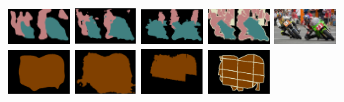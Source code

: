 \begin{figure}[h!]
\begin{subfigure}{0.55\textwidth}
		\includegraphics[width=0.18\textwidth]{image/result/compare/my_motor.png}
		\includegraphics[width=0.18\textwidth]{image/result/compare/fcn_motor.png}
		\includegraphics[width=0.18\textwidth]{image/result/compare/sds_motor.png}
		\includegraphics[width=0.18\textwidth]{image/result/compare/2007_005173.png}
		\includegraphics[width=0.18\textwidth]{image/result/compare/2007_005173.jpg}
		\\
		\includegraphics[width=0.18\textwidth]{image/result/compare/my_sheep.pdf}
		\includegraphics[width=0.18\textwidth]{image/result/compare/fcn_sheep.png}
		\includegraphics[width=0.18\textwidth]{image/result/compare/sds_sheep.png}
		\includegraphics[width=0.18\textwidth]{image/result/compare/gt_sheep.pdf}

\end{subfigure}
\end{figure}
